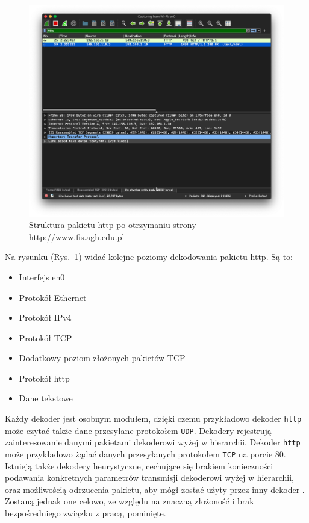 \documentclass[a4paper, 11pt, twoside, openright]{article}
\begin{document}
	\begin{figure}[h]
		\centering
			\includegraphics[width=1.0\textwidth]{img/screenshot_fis.png}
		\caption{Struktura pakietu http po otrzymaniu strony http://www.fis.agh.edu.pl}
		\label{fig:fis}
	\end{figure}

	Na rysunku (Rys.~\ref{fig:fis}) widać kolejne poziomy dekodowania pakietu http. Są to:
	\begin{itemize}
		\item Interfejs en0
		\item Protokół Ethernet
		\item Protokół IPv4
		\item Protokół TCP
		\item Dodatkowy poziom złożonych pakietów TCP
		\item Protokół http
		\item Dane tekstowe
	\end{itemize}

	Każdy dekoder jest osobnym modułem, dzięki czemu przykładowo dekoder \texttt{http} może czytać także dane przesyłane protokołem \texttt{UDP}.
	Dekodery rejestrują zainteresowanie danymi pakietami dekoderowi wyżej w hierarchii. Dekoder \texttt{http} może przykładowo
	żądać danych przesyłanych protokołem \texttt{TCP} na porcie 80. Istnieją także dekodery heurystyczne, cechujące się brakiem
	konieczności podawania konkretnych parametrów transmisji dekoderowi wyżej w hierarchii, oraz możliwością odrzucenia pakietu,
	aby mógł zostać użyty przez inny dekoder \cite{README.heuristic}. Zostaną jednak one celowo, ze względu na znaczną złożoność i brak bezpośredniego
	związku z pracą, pominięte.
\end{document}
